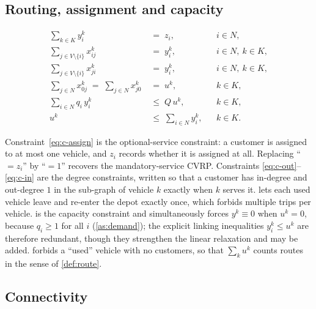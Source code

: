 \documentclass[11pt,a4paper]{article}
\theoremstyle{definition}
\theoremstyle{plain}
\newcommand{\Cust}{N}
\newcommand{\Nodes}{V}
\newcommand{\Veh}{K}
\begin{document}
\subsection{Routing, assignment and capacity}
\label{sec:milp-routing}

\begin{align}
  \sum_{k \in \Veh} y^k_i &\;=\; z_i,
  & &i \in \Cust, \label{eq:c-assign}\\
  \sum_{j \in \Nodes \setminus \{i\}} x^k_{ij} &\;=\; y^k_i,
  & &i \in \Cust,\ k \in \Veh, \label{eq:c-out}\\
  \sum_{j \in \Nodes \setminus \{i\}} x^k_{ji} &\;=\; y^k_i,
  & &i \in \Cust,\ k \in \Veh, \label{eq:c-in}\\
  \sum_{j \in \Cust} x^k_{0j} \;=\; \sum_{j \in \Cust} x^k_{j0}
  &\;=\; u^k,
  & &k \in \Veh, \label{eq:c-depot}\\
  \sum_{i \in \Cust} q_i\, y^k_i &\;\le\; Q\, u^k,
  & &k \in \Veh, \label{eq:c-cap}\\
  u^k &\;\le\; \sum_{i \in \Cust} y^k_i,
  & &k \in \Veh. \label{eq:c-nonempty}
\end{align}

Constraint~\eqref{eq:c-assign} is the optional-service constraint: a customer is
assigned to at most one vehicle, and $z_i$ records whether it is assigned at
all.  Replacing ``$= z_i$'' by ``$= 1$'' recovers the mandatory-service CVRP.
Constraints \eqref{eq:c-out}--\eqref{eq:c-in} are the degree constraints,
written so that a customer has in-degree and out-degree $1$ in the
sub-graph of vehicle $k$ exactly when $k$ serves it.   lets
each used vehicle leave and re-enter the depot exactly once, which forbids
multiple trips per vehicle.   is the capacity constraint and
simultaneously forces $y^k \equiv 0$ when $u^k = 0$, because $q_i \ge 1$ for
all $i$ (\cref{as:demand}); the explicit linking inequalities
$y^k_i \le u^k$ are therefore redundant, though they strengthen the linear
relaxation and may be added.   forbids a ``used'' vehicle
with no customers, so that $\sum_k u^k$ counts routes in the sense of
\cref{def:route}.

\subsection{Connectivity}
\label{sec:milp-flow}
\end{document}
